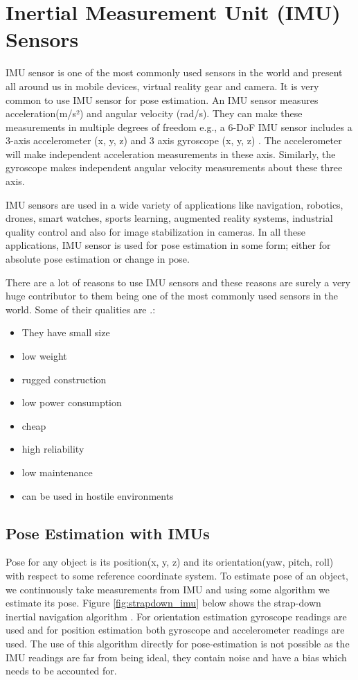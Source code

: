 \section{Inertial Measurement Unit (IMU) Sensors}
\label{sec:imu}
IMU sensor is one of the most commonly used sensors in the world and present all around us in mobile devices, virtual reality gear and camera. It is very common to use IMU sensor for pose estimation. An IMU sensor measures acceleration(m/s²) and angular velocity (rad/s).  They can make these measurements in multiple degrees of freedom e.g., a 6-DoF IMU sensor includes a 3-axis accelerometer (x, y, z) and 3 axis gyroscope (x, y, z)  \citep{constant2021data}. The accelerometer will make independent acceleration measurements in these axis. Similarly, the gyroscope makes independent angular velocity measurements about these three axis.

IMU sensors are used in a wide variety of applications like navigation, robotics, drones, smart watches, sports learning, augmented reality systems, industrial quality control \citep{ahmad2013reviews}  and also for image stabilization in cameras. In all these applications, IMU sensor is used for pose estimation in some form; either for absolute pose estimation or change in pose.

There are a lot of reasons to use IMU sensors and these reasons are surely a very huge contributor to them being one of the most commonly used sensors in the world. Some of their qualities are \citep{woodman2007introduction}.:

\begin{itemize}
\item They have small size
\item low weight
\item rugged construction 
\item low power consumption 
\item cheap
\item high reliability 
\item low maintenance
\item can be used in hostile environments 
\end{itemize}

\subsection{Pose Estimation with IMUs}
Pose for any object is its position(x, y, z) and its orientation(yaw, pitch, roll) with respect to some reference coordinate system. To estimate pose of an object, we continuously take measurements from IMU and using some algorithm we estimate its pose. Figure \ref{fig:strapdown_imu} below shows the strap-down inertial navigation algorithm \citep{woodman2007introduction}. For orientation estimation gyroscope readings are used and for position estimation both gyroscope and accelerometer readings are used. The use of this algorithm directly for pose-estimation is not possible as the IMU readings are far from being ideal, they contain noise and have a bias \citep{woodman2007introduction} which needs to be accounted for.

